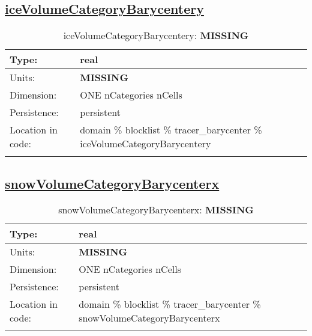 \subsection[iceVolumeCategoryBarycentery]{\hyperref[sec:var_tab_tracer_barycenter]{iceVolumeCategoryBarycentery}}
\label{subsec:var_sec_tracer_barycenter_iceVolumeCategoryBarycentery}
\begin{center}
\begin{longtable}{| p{2.0in} | p{4.0in} |}
        \hline 
        Type: & real \\
        \hline 
        Units: & {\bf \color{red} MISSING} \\
        \hline 
        Dimension: & ONE nCategories nCells \\
        \hline 
        Persistence: & persistent \\
        \hline 
         Location in code: & domain \% blocklist \% tracer\_barycenter \% iceVolumeCategoryBarycentery \\
         \hline 
    \caption{iceVolumeCategoryBarycentery: {\bf \color{red} MISSING}}
\end{longtable}
\end{center}
\subsection[snowVolumeCategoryBarycenterx]{\hyperref[sec:var_tab_tracer_barycenter]{snowVolumeCategoryBarycenterx}}
\label{subsec:var_sec_tracer_barycenter_snowVolumeCategoryBarycenterx}
\begin{center}
\begin{longtable}{| p{2.0in} | p{4.0in} |}
        \hline 
        Type: & real \\
        \hline 
        Units: & {\bf \color{red} MISSING} \\
        \hline 
        Dimension: & ONE nCategories nCells \\
        \hline 
        Persistence: & persistent \\
        \hline 
         Location in code: & domain \% blocklist \% tracer\_barycenter \% snowVolumeCategoryBarycenterx \\
         \hline 
    \caption{snowVolumeCategoryBarycenterx: {\bf \color{red} MISSING}}
\end{longtable}
\end{center}
